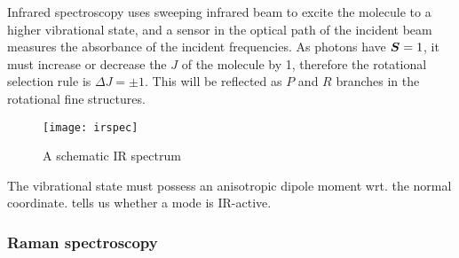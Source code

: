 Infrared spectroscopy uses sweeping infrared beam to excite the molecule to a higher vibrational state, 
and a sensor in the optical path of the incident beam measures the absorbance of the incident frequencies.
As photons have $\boldsymbol{S}=1$, it must increase or decrease the $J$ of the molecule by 1, 
therefore the rotational selection rule is $\Delta J=\pm1$. 
This will be reflected as $P$ and $R$ branches in the rotational fine structures.
\begin{figure}[H]
	\texttt{[image: irspec]}
	\centering
	\caption{A schematic IR spectrum}
	\label{fig:irspec}
\end{figure}
The vibrational state must possess an anisotropic dipole moment wrt. the normal coordinate.  tells us whether a mode is IR-active.
\subsubsection{Raman spectroscopy}

